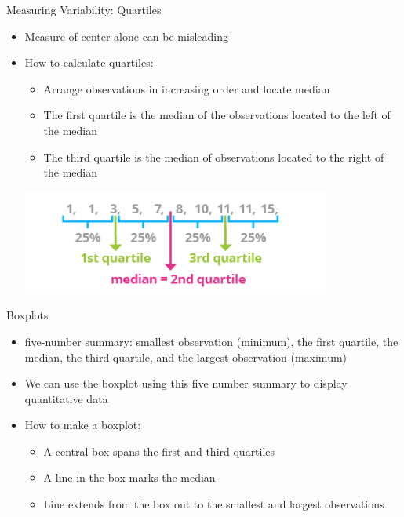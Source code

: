 \documentclass{beamer}
\begin{document}
\begin{frame}{Measuring Variability: Quartiles}
	
	\begin{itemize}
		\item Measure of center alone can be misleading
		\item How to calculate quartiles:
		      \begin{itemize}
		      	\item Arrange observations in increasing order and locate median 
		      	\item The \alert{first quartile} is the median of the observations located to the left of the median
		      	\item The \alert{third quartile} is the median of observations located to the right of the median
              \end{itemize}
              
		      \begin{center}
		      	\includegraphics[width=0.8\textwidth]{quartiles}
		      \end{center}
		      
	\end{itemize}
\end{frame}



\begin{frame}{Boxplots}
	\begin{itemize}
		\item \alert{five-number summary}: smallest observation (minimum), the first quartile, the median, the third quartile, and the largest observation (maximum)
		\item We can use the \alert{boxplot} using this five number summary to display quantitative data
		\item How to make a boxplot:
		      \begin{itemize}
		      	\item A central box spans the first and third quartiles 
		      	\item A line in the box marks the median
		      	\item Line extends from the box out to the smallest and largest observations 
		      \end{itemize}
	\end{itemize}
\end{frame}
\end{document}
